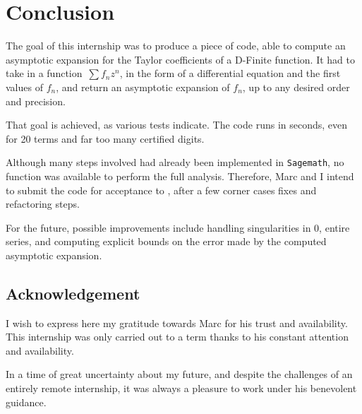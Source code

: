 \documentclass[../main.tex]{subfiles}
\begin{document}
\chapter{Conclusion}

The goal of this internship was to produce a piece of code, able to compute an asymptotic expansion for the Taylor coefficients of a D-Finite function. It had to take in a function~$\sum f_n z^n$, in the form of a differential equation and the first values of $f_n$, and return an asymptotic expansion of $f_n$, up to any desired order and precision.

That goal is achieved, as various tests indicate. The code runs in seconds, even for 20 terms and far too many certified digits.

Although many steps involved had already been implemented in \verb|Sagemath|, no function was available to perform the full analysis.
Therefore, Marc and I intend to submit the code for acceptance to , after a few corner cases fixes and refactoring steps.

For the future, possible improvements include handling singularities in 0, entire series, and computing explicit bounds on the error made by the computed asymptotic expansion.

\section*{Acknowledgement}

I wish to express here my gratitude towards Marc for his trust and availability. This internship was only carried out to a term thanks to his constant attention and availability.

In a time of great uncertainty about my future, and despite the challenges of an entirely remote internship, it was always a pleasure to work under his benevolent guidance.
\end{document}
